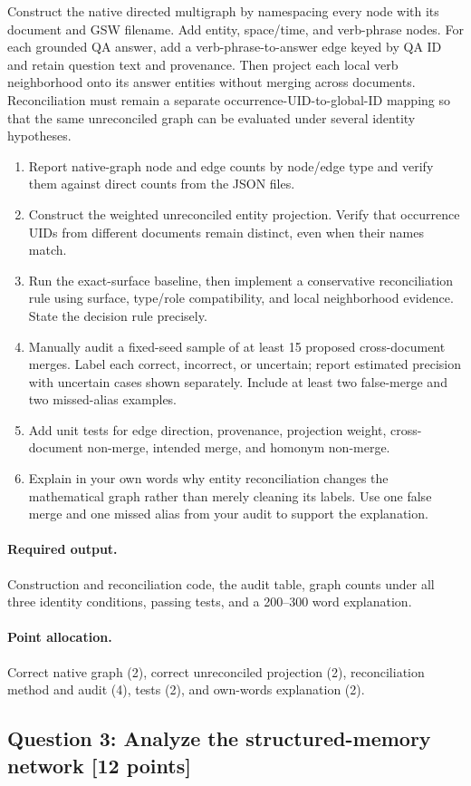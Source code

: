 \documentclass[11pt]{article}
\newcommand{\question}[3]{%
  \subsection[Question #1: #2 (#3 points)]{Question #1: #2 \hfill [#3 points]}%
}
\newcommand{\deliverables}{\paragraph{Required output.}}
\newcommand{\grading}{\paragraph{Point allocation.}}
\begin{document}
Construct the native directed multigraph by namespacing every node with its
document and GSW filename. Add entity, space/time, and verb-phrase nodes. For
each grounded QA answer, add a verb-phrase-to-answer edge keyed by QA ID and
retain question text and provenance. Then project each local verb neighborhood
onto its answer entities without merging across documents. Reconciliation
must remain a separate occurrence-UID-to-global-ID mapping so that the same
unreconciled graph can be evaluated under several identity hypotheses.

\begin{enumerate}[label=(\alph*)]
  \item Report native-graph node and edge counts by node/edge type and verify
        them against direct counts from the JSON files.
  \item Construct the weighted unreconciled entity projection. Verify that
        occurrence UIDs from different documents remain distinct, even when
        their names match.
  \item Run the exact-surface baseline, then implement a conservative
        reconciliation rule using surface, type/role compatibility, and local
        neighborhood evidence. State the decision rule precisely.
  \item Manually audit a fixed-seed sample of at least 15 proposed
        cross-document merges. Label each correct, incorrect, or uncertain;
        report estimated precision with uncertain cases shown separately.
        Include at least two false-merge and two missed-alias examples.
  \item Add unit tests for edge direction, provenance, projection weight,
        cross-document non-merge, intended merge, and homonym non-merge.
  \item Explain in your own words why entity reconciliation changes the
        mathematical graph rather than merely cleaning its labels. Use one
        false merge and one missed alias from your audit to support the
        explanation.
\end{enumerate}

\deliverables Construction and reconciliation code, the audit table, graph
counts under all three identity conditions, passing tests, and a 200--300 word
explanation.

\grading Correct native graph (2), correct unreconciled projection (2),
reconciliation method and audit (4), tests (2), and own-words explanation (2).

\question{3}{Analyze the structured-memory network}{12}
\end{document}
